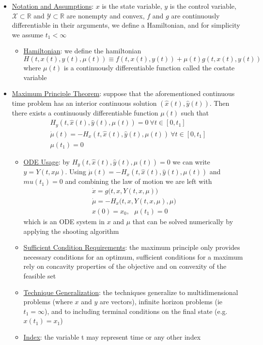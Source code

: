 \documentclass{article}
\begin{document}
\begin{itemize}
    \item \underline{Notation and Assumptions}: $x$ is the state variable, $y$ is the control variable, $\mathcal{X} \subset \mathbb{R}$  and $\mathcal{Y} \subset \mathbb{R}$ are nonempty and convex, $f$ and $g$ are continuously differentiable in their arguments, we define a Hamiltonian, and for simplicity we assume $t_{1} < \infty$
    \begin{itemize}
        \item  \underline{Hamiltonian}: we define the hamiltonian $$H(t,x(t),y(t),\mu(t)) \equiv f(t,x(t),y(t)) + \mu(t)g(t,x(t),y(t))$$ where $\mu(t)$ is a continuously differentiable function called the costate variable
    \end{itemize}
    \item  \underline{Maximum Principle Theorem}: suppose that the aforementioned continuous time problem has an interior continuous solution $(\widehat{x}(t), \widehat{y}(t))$. Then there exists a continuously differentiable function $\mu(t)$ such that
    \begin{gather*} H_{y}(t,\widehat{x}(t), \widehat{y}(t), \mu(t)) = 0 \ \forall t \in [0, t_{1}] \\ \dot{\mu}(t) = -H_{x}(t, \widehat{x}(t), \widehat{y}(t), \mu(t)) \ \forall t \in [0, t_{1}] \\ \mu(t_{1}) = 0 \end{gather*}
    \begin{itemize}
        \item \underline{ODE Usage}: by $H_{y}(t,\widehat{x}(t), \widehat{y}(t), \mu(t)) = 0$ we can write $y = Y(t, x \mu)$. Using $\dot{\mu}(t) = -H_{x}(t, \widehat{x}(t), \widehat{y}(t), \mu(t))$ and $mu(t_{1}) = 0$ and combining the law of motion we are left with
        \begin{gather*} \dot{x} = g\big(t, x, Y(t,x,\mu)\big) \\ \dot{\mu} = -H_{x}\big(t,x,Y(t,x,\mu),\mu \big) \\ x(0) = x_{0}, \ \ \ \mu(t_{1}) = 0 \end{gather*}
        which is an ODE system in $x$ and $\mu$ that can be solved numerically by applying the shooting algorithm
        \item \underline{Sufficient Condition Requirements}: the maximum principle only provides necessary conditions for an optimum, sufficient conditions for a maximum rely on concavity properties of the objective and on convexity of the feasible set
        \item \underline{Technique Generalization}: the techniques generalize to multidimensional problems (where $x$ and $y$ are vectors), infinite horizon problems (ie $t_{1} = \infty$), and to including terminal conditions on the final state (e.g. $x(t_{1}) = x_{1}$)
        \item \underline{Index}: the variable t may represent time or any other index
    \end{itemize}
\end{itemize}
\end{document}
